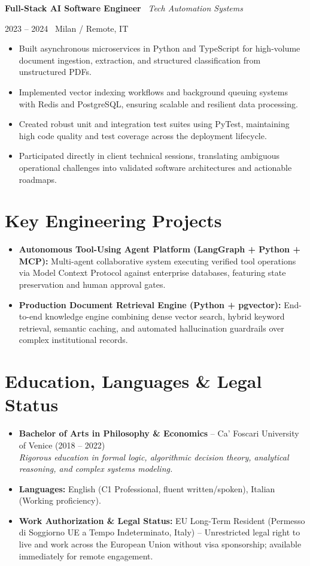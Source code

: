 \documentclass[a4paper,10pt]{article}
\newcommand{\role}[4]{%
  \vspace{2pt}\noindent
  \begin{minipage}[t]{0.70\textwidth}\raggedright\textbf{#1} \textbullet\ \textit{#3}\end{minipage}%
  \hfill
  \begin{minipage}[t]{0.28\textwidth}\raggedleft\footnotesize\color{gray}#2 \textbullet\ #4\end{minipage}%
  \vspace{1pt}%
}
\begin{document}
\vspace{3pt}
\role{Full-Stack AI Software Engineer}{2023 -- 2024}{Tech Automation Systems}{Milan / Remote, IT}
\begin{itemize}
  \item Built asynchronous microservices in Python and TypeScript for high-volume document ingestion, extraction, and structured classification from unstructured PDFs.
  \item Implemented vector indexing workflows and background queuing systems with Redis and PostgreSQL, ensuring scalable and resilient data processing.
  \item Created robust unit and integration test suites using PyTest, maintaining high code quality and test coverage across the deployment lifecycle.
  \item Participated directly in client technical sessions, translating ambiguous operational challenges into validated software architectures and actionable roadmaps.
\end{itemize}

\section{Key Engineering Projects}
\begin{itemize}
  \item \textbf{Autonomous Tool-Using Agent Platform (LangGraph + Python + MCP):} Multi-agent collaborative system executing verified tool operations via Model Context Protocol against enterprise databases, featuring state preservation and human approval gates.
  \item \textbf{Production Document Retrieval Engine (Python + pgvector):} End-to-end knowledge engine combining dense vector search, hybrid keyword retrieval, semantic caching, and automated hallucination guardrails over complex institutional records.
\end{itemize}

\section{Education, Languages \& Legal Status}
\begin{itemize}
  \item \textbf{Bachelor of Arts in Philosophy \& Economics} -- Ca' Foscari University of Venice (2018 -- 2022) \\
  \textit{Rigorous education in formal logic, algorithmic decision theory, analytical reasoning, and complex systems modeling.}
  \item \textbf{Languages:} English (C1 Professional, fluent written/spoken), Italian (Working proficiency).
  \item \textbf{Work Authorization \& Legal Status:} EU Long-Term Resident (Permesso di Soggiorno UE a Tempo Indeterminato, Italy) -- Unrestricted legal right to live and work across the European Union without visa sponsorship; available immediately for remote engagement.
\end{itemize}
\end{document}
